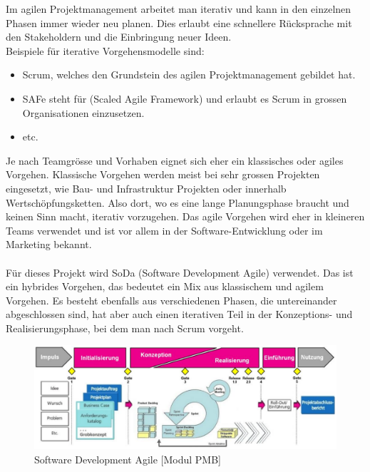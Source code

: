 \documentclass[a4paper, table]{article}
\begin{document}
Im agilen Projektmanagement arbeitet man iterativ und kann in den einzelnen Phasen immer wieder neu planen. 
Dies erlaubt eine schnellere Rücksprache mit den Stakeholdern und die Einbringung neuer Ideen.\\
Beispiele für iterative Vorgehensmodelle sind:
\begin{itemize}
    \item Scrum, welches den Grundstein des agilen Projektmanagement gebildet hat.
    \item SAFe steht für (Scaled Agile Framework) und erlaubt es Scrum in grossen Organisationen einzusetzen.
    \item etc. \autocite{noauthor_liste_2022}
\end{itemize}

Je nach Teamgrösse und Vorhaben eignet sich eher ein klassisches oder agiles Vorgehen. 
Klassische Vorgehen werden meist bei sehr grossen Projekten eingesetzt, wie Bau- und Infrastruktur Projekten oder innerhalb Wertschöpfungsketten. 
Also dort, wo es eine lange Planungsphase braucht und keinen Sinn macht, iterativ vorzugehen. 
Das agile Vorgehen wird eher in kleineren Teams verwendet und ist vor allem in der Software-Entwicklung oder im Marketing bekannt.\\\\
Für dieses Projekt wird \gls{SoDa} (Software Development Agile) verwendet. 
Das ist ein hybrides Vorgehen, das bedeutet ein Mix aus klassischem und agilem Vorgehen. 
Es besteht ebenfalls aus verschiedenen Phasen, die untereinander abgeschlossen sind, hat aber auch einen iterativen Teil in der Konzeptions- und Realisierungsphase, bei dem man nach Scrum vorgeht.\autocite[p.~51]{martin_jud_grundlagen_2021}

\begin{figure}[h]
    \centering
    \includegraphics[width=1.0\textwidth]{img/SoDa.png}
    \caption{Software Development Agile [Modul PMB]}
    \label{fig:SoDa}
\end{figure}
\end{document}
